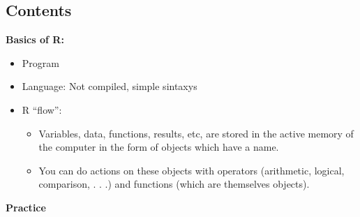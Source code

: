 \documentclass[]{book}
\providecommand{\tightlist}{%
  \setlength{\itemsep}{0pt}\setlength{\parskip}{0pt}}
\theoremstyle{definition}
\theoremstyle{definition}
\theoremstyle{definition}
\theoremstyle{remark}
\begin{document}
\hypertarget{contents}{%
\subsection{Contents}\label{contents}}

\textbf{Basics of R:}

\begin{itemize}
\tightlist
\item
  Program
\item
  Language: Not compiled, simple sintaxys
\item
  R ``flow'':

  \begin{itemize}
  \tightlist
  \item
    Variables, data, functions, results, etc, are stored in the active
    memory of the computer in the form of objects which have a name.
  \item
    You can do actions on these objects with operators (arithmetic,
    logical, comparison, . . .) and functions (which are themselves
    objects).
  \end{itemize}
\end{itemize}

\textbf{Practice}
\end{document}
